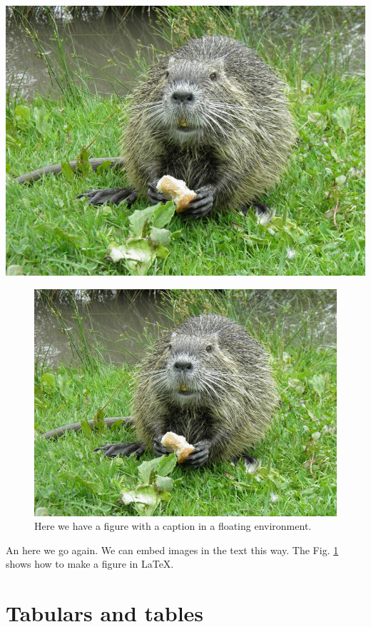 \documentclass[10pt,a4paper,twoside]{article}
\begin{document}
\begin{center}
  \includegraphics[width = .8\textwidth]{figures/ragondin_small.jpg}
\end{center}

\begin{figure}[hb]
  \begin{center}
    \includegraphics[width = .8\textwidth]{figures/ragondin_small.jpg}
  \end{center}
  \caption{Here we have a figure with a caption in a floating environment.
    \blindtext[1]}
  \label{fig:ragondin_explained}
\end{figure}

\noindent An here we go again.
We can embed images in the text this way.
The Fig. \ref{fig:ragondin_explained} shows how to make a figure in \LaTeX .




\blindtext[4]

\section{Tabulars and tables}
\end{document}

